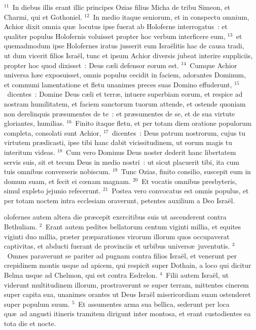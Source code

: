 ${}^{11}$~In diebus illis erant illic principes Ozias filius Micha de tribu Simeon, et Charmi, qui et Gothoniel.
${}^{12}$~In medio itaque seniorum, et in conspectu omnium, Achior dixit omnia qu\ae\ locutus ipse fuerat ab Holoferne interrogatus~: et qualiter populus Holofernis voluisset propter hoc verbum interficere eum,
${}^{13}$~et quemadmodum ipse Holofernes iratus jusserit eum Isra\"elitis hac de causa tradi, ut dum vicerit filios Isra\"el, tunc et ipsum Achior diversis jubeat interire suppliciis, propter hoc quod dixisset~: Deus c\ae li defensor eorum est.
${}^{14}$~Cumque Achior universa h\ae c exposuisset, omnis populus cecidit in faciem, adorantes Dominum, et communi lamentatione et fletu unanimes preces suas Domino effuderunt,
${}^{15}$~dicentes~: Domine Deus c\ae li et terr\ae , intuere superbiam eorum, et respice ad nostram humilitatem, et faciem sanctorum tuorum attende, et ostende quoniam non derelinquis pr\ae sumentes de te~: et pr\ae sumentes de se, et de sua virtute gloriantes, humilias.
${}^{16}$~Finito itaque fletu, et per totam diem oratione populorum completa, consolati sunt Achior,
${}^{17}$~dicentes~: Deus patrum nostrorum, cujus tu virtutem pr\ae dicasti, ipse tibi hanc dabit vicissitudinem, ut eorum magis tu interitum videas.
${}^{18}$~Cum vero Dominus Deus noster dederit hanc libertatem servis suis, sit et tecum Deus in medio nostri~: ut sicut placuerit tibi, ita cum tuis omnibus converseris nobiscum.
${}^{19}$~Tunc Ozias, finito consilio, suscepit eum in domum suam, et fecit ei cœnam magnam.
${}^{20}$~Et vocatis omnibus presbyteris, simul expleto jejunio refecerunt.
${}^{21}$~Postea vero convocatus est omnis populus, et per totam noctem intra ecclesiam oraverunt, petentes auxilium a Deo Isra\"el.

\bchapter
{}olofernes autem altera die pr\ae cepit exercitibus suis ut ascenderent contra Bethuliam.
${}^{2}$~Erant autem pedites bellatorum centum viginti millia, et equites viginti duo millia, pr\ae ter pr\ae parationes virorum illorum quos occupaverat captivitas, et abducti fuerant de provinciis et urbibus univers\ae\ juventutis.
${}^{3}$~Omnes paraverunt se pariter ad pugnam contra filios Isra\"el, et venerunt per crepidinem montis usque ad apicem, qui respicit super Dothain, a loco qui dicitur Belma usque ad Chelmon, qui est contra Esdrelon.
${}^{4}$~Filii autem Isra\"el, ut viderunt multitudinem illorum, prostraverunt se super terram, mittentes cinerem super capita sua, unanimes orantes ut Deus Isra\"el misericordiam suam ostenderet super populum suum.
${}^{5}$~Et assumentes arma sua bellica, sederunt per loca qu\ae\ ad angusti itineris tramitem dirigunt inter montosa, et erant custodientes ea tota die et nocte.



